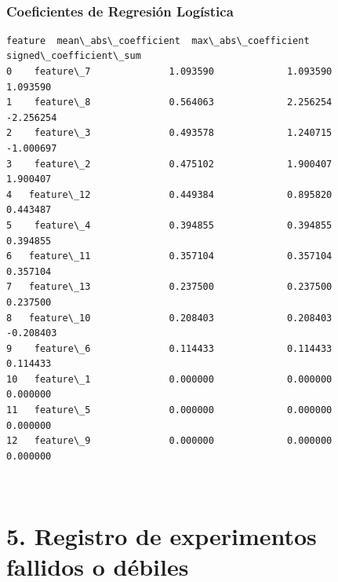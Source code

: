 \documentclass[11pt]{article}
\begin{document}
    
    \begin{center}
    \end{center}
    { \hspace*{\fill} \\}
    
    \subsubsection{Coeficientes de Regresión
Logística}\label{coeficientes-de-regresiuxf3n-loguxedstica}

    
    
    \begin{Verbatim}[commandchars=\\\{\}]
       feature  mean\_abs\_coefficient  max\_abs\_coefficient  signed\_coefficient\_sum
0    feature\_7              1.093590             1.093590                1.093590
1    feature\_8              0.564063             2.256254               -2.256254
2    feature\_3              0.493578             1.240715               -1.000697
3    feature\_2              0.475102             1.900407                1.900407
4   feature\_12              0.449384             0.895820                0.443487
5    feature\_4              0.394855             0.394855                0.394855
6   feature\_11              0.357104             0.357104                0.357104
7   feature\_13              0.237500             0.237500                0.237500
8   feature\_10              0.208403             0.208403               -0.208403
9    feature\_6              0.114433             0.114433                0.114433
10   feature\_1              0.000000             0.000000                0.000000
11   feature\_5              0.000000             0.000000                0.000000
12   feature\_9              0.000000             0.000000                0.000000
    \end{Verbatim}

    
    \begin{center}
    \end{center}
    { \hspace*{\fill} \\}
    
    \section{5. Registro de experimentos fallidos o
débiles}\label{registro-de-experimentos-fallidos-o-duxe9biles}
\end{document}
